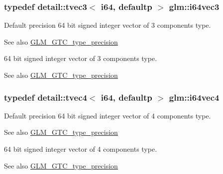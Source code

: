 \subsubsection[{\texorpdfstring{i64vec3}{i64vec3}}]{\setlength{\rightskip}{0pt plus 5cm}typedef detail\+::tvec3$<$ i64, defaultp $>$ {\bf glm\+::i64vec3}}\hypertarget{group__gtc__type__precision_gab6eefcd7eb24e4142ed23dc1e87163a6}{}\label{group__gtc__type__precision_gab6eefcd7eb24e4142ed23dc1e87163a6}
Default precision 64 bit signed integer vector of 3 components type. \begin{DoxySeeAlso}{See also}
\hyperlink{group__gtc__type__precision}{G\+L\+M\+\_\+\+G\+T\+C\+\_\+type\+\_\+precision}
\end{DoxySeeAlso}
64 bit signed integer vector of 3 components type. \begin{DoxySeeAlso}{See also}
\hyperlink{group__gtc__type__precision}{G\+L\+M\+\_\+\+G\+T\+C\+\_\+type\+\_\+precision} 
\end{DoxySeeAlso}
\subsubsection[{\texorpdfstring{i64vec4}{i64vec4}}]{\setlength{\rightskip}{0pt plus 5cm}typedef detail\+::tvec4$<$ i64, defaultp $>$ {\bf glm\+::i64vec4}}\hypertarget{group__gtc__type__precision_ga19846034cab6ee6e031884ea30def7fc}{}\label{group__gtc__type__precision_ga19846034cab6ee6e031884ea30def7fc}
Default precision 64 bit signed integer vector of 4 components type. \begin{DoxySeeAlso}{See also}
\hyperlink{group__gtc__type__precision}{G\+L\+M\+\_\+\+G\+T\+C\+\_\+type\+\_\+precision}
\end{DoxySeeAlso}
64 bit signed integer vector of 4 components type. \begin{DoxySeeAlso}{See also}
\hyperlink{group__gtc__type__precision}{G\+L\+M\+\_\+\+G\+T\+C\+\_\+type\+\_\+precision} 
\end{DoxySeeAlso}
